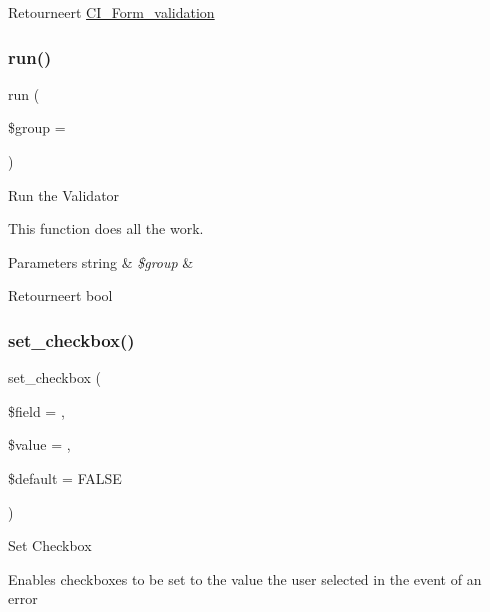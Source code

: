 \begin{DoxyReturn}{Retourneert}
\mbox{\hyperlink{class_c_i___form__validation}{C\+I\+\_\+\+Form\+\_\+validation}} 
\end{DoxyReturn}
\mbox{\label{class_c_i___form__validation_a304567453dbe1809dc0dc3ad99918383}} 
\subsubsection{\texorpdfstring{run()}{run()}}
{\footnotesize\ttfamily run (\begin{DoxyParamCaption}\item[{}]{\$group = {\ttfamily \textquotesingle{}\textquotesingle{}} }\end{DoxyParamCaption})}

Run the Validator

This function does all the work.


\begin{DoxyParams}[1]{Parameters}
string & {\em \$group} & \\
\hline
\end{DoxyParams}
\begin{DoxyReturn}{Retourneert}
bool 
\end{DoxyReturn}
\mbox{\label{class_c_i___form__validation_a9b8766fbc61e15894d8d036552503228}} 
\subsubsection{\texorpdfstring{set\_checkbox()}{set\_checkbox()}}
{\footnotesize\ttfamily set\+\_\+checkbox (\begin{DoxyParamCaption}\item[{}]{\$field = {\ttfamily \textquotesingle{}\textquotesingle{}},  }\item[{}]{\$value = {\ttfamily \textquotesingle{}\textquotesingle{}},  }\item[{}]{\$default = {\ttfamily FALSE} }\end{DoxyParamCaption})}

Set Checkbox

Enables checkboxes to be set to the value the user selected in the event of an error


